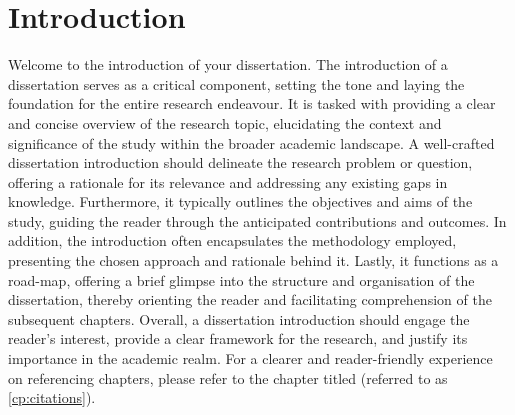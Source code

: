 \chapter{Introduction}
\label{cp:introduction}
Welcome to the introduction of your dissertation. The introduction of a dissertation serves as a critical component, setting the tone and laying the foundation for the entire research endeavour. It is tasked with providing a clear and concise overview of the research topic, elucidating the context and significance of the study within the broader academic landscape. A well-crafted dissertation introduction should delineate the research problem or question, offering a rationale for its relevance and addressing any existing gaps in knowledge. Furthermore, it typically outlines the objectives and aims of the study, guiding the reader through the anticipated contributions and outcomes. In addition, the introduction often encapsulates the methodology employed, presenting the chosen approach and rationale behind it. Lastly, it functions as a road-map, offering a brief glimpse into the structure and organisation of the dissertation, thereby orienting the reader and facilitating comprehension of the subsequent chapters. Overall, a dissertation introduction should engage the reader's interest, provide a clear framework for the research, and justify its importance in the academic realm. For a clearer and reader-friendly experience on referencing chapters, please refer to the chapter titled  (referred to as \autoref{cp:citations}).